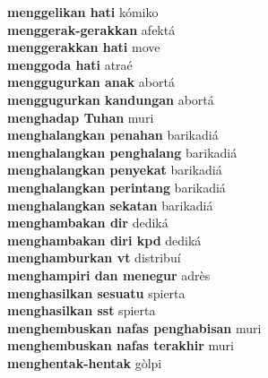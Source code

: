 \textbf{ menggelikan hati  } kómiko \\
\textbf{ menggerak-gerakkan  } afektá \\
\textbf{ menggerakkan hati  } move \\
\textbf{ menggoda hati  } atraé \\
\textbf{ menggugurkan anak  } abortá \\
\textbf{ menggugurkan kandungan  } abortá \\
\textbf{ menghadap Tuhan  } muri \\
\textbf{ menghalangkan penahan  } barikadiá \\
\textbf{ menghalangkan penghalang  } barikadiá \\
\textbf{ menghalangkan penyekat  } barikadiá \\
\textbf{ menghalangkan perintang  } barikadiá \\
\textbf{ menghalangkan sekatan  } barikadiá \\
\textbf{ menghambakan dir  } dediká \\
\textbf{ menghambakan diri kpd  } dediká \\
\textbf{ menghamburkan vt  } distribuí \\
\textbf{ menghampiri dan menegur  } adrès \\
\textbf{ menghasilkan sesuatu  } spierta \\
\textbf{ menghasilkan sst  } spierta \\
\textbf{ menghembuskan nafas penghabisan  } muri \\
\textbf{ menghembuskan nafas terakhir  } muri \\
\textbf{ menghentak-hentak  } gòlpi \\
